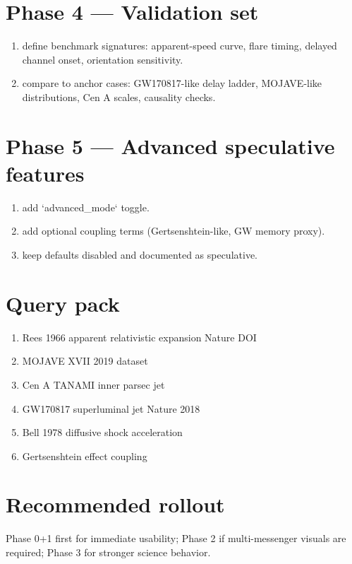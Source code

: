 \documentclass[11pt]{article}
\begin{document}
\section{Phase 4 --- Validation set}
\begin{enumerate}
\item define benchmark signatures: apparent-speed curve, flare timing, delayed channel onset, orientation sensitivity.
\item compare to anchor cases: GW170817-like delay ladder, MOJAVE-like distributions, Cen A scales, causality checks.
\end{enumerate}

\section{Phase 5 --- Advanced speculative features}
\begin{enumerate}
\item add `advanced\_mode` toggle.
\item add optional coupling terms (Gertsenshtein-like, GW memory proxy).
\item keep defaults disabled and documented as speculative.
\end{enumerate}

\section{Query pack}
\begin{enumerate}
\item Rees 1966 apparent relativistic expansion Nature DOI
\item MOJAVE XVII 2019 dataset
\item Cen A TANAMI inner parsec jet
\item GW170817 superluminal jet Nature 2018
\item Bell 1978 diffusive shock acceleration
\item Gertsenshtein effect coupling
\end{enumerate}

\section{Recommended rollout}
Phase 0+1 first for immediate usability; Phase 2 if multi-messenger visuals are required; Phase 3 for stronger science behavior.
\end{document}
